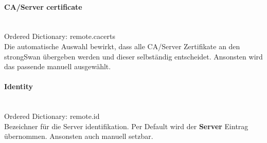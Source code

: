 \begin{minipage}[t]{0.5\textwidth}
\paragraph{CA/Server certificate}\mbox{}\\
\hspace*{18pt}Ordered Dictionary: remote.cacerts\\
Die automatische Auswahl bewirkt, dass alle CA/Server Zertifikate an den strongSwan übergeben werden und dieser selbständig entscheidet. Ansonsten wird das passende manuell ausgewählt.\\

\paragraph{Identity}\mbox{}\\
\hspace*{18pt}Ordered Dictionary: remote.id\\
Bezeichner für die Server identifikation. Per Default wird der \textbf{Server} Eintrag übernommen. Ansonsten auch manuell setzbar.\\

\end{minipage}
\newpage

